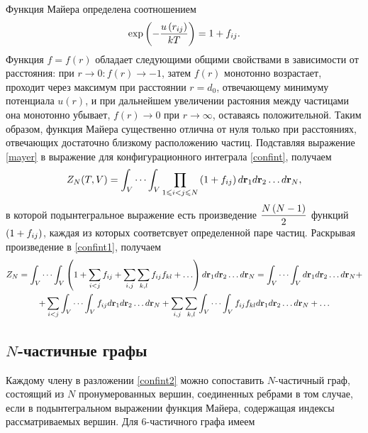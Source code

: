 Функция Майера определена соотношением
\vverh
\begin{gather}
	\exp \left( - \frac{u \left( r_{ij} \right)}{kT} \right) = 1 + f_{ij} . \label{mayer}
\end{gather}
Функция $f = f(r)$ обладает следующими общими свойствами в зависимости от расстояния: при $r \longrightarrow 0: f(r) \longrightarrow -1$, затем $f(r)$ монотонно возрастает, проходит через максимум при расстоянии $r = d_0$, отвечающему минимуму потенциала $u(r)$, и при дальнейшем увеличении растояния между частицами она монотонно убывает, $f(r) \longrightarrow 0$ при $r \longrightarrow \infty$, оставаясь положительной. Таким образом, функция Майера существенно отлична от нуля только при расстояниях, отвечающих достаточно близкому расположению частиц. Подставляя выражение \eqref{mayer} в выражение для конфигурационного интеграла \eqref{confint}, получаем
\vverh
\begin{gather}
	Z_N (T, V) = \int_V \cdots \int_V \prod_{1 \leqslant i < j \leqslant N} \left( 1 + f_{ij} \right) d \mathbf{r}_1 d \mathbf{r}_2 \dots d \mathbf{r}_N , \label{confint1}
\end{gather}
в которой подынтегральное выражение есть произведение $\displaystyle\frac{N \left( N - 1 \right)}{2}$ функций $\left( 1 + f_{ij} \right)$, каждая из которых соответсвует определенной паре частиц. Раскрывая произведение в \eqref{confint1}, получаем
\vverh
\begin{gather}
	Z_N = \int_V \cdots \int_V \lb 1 + \sum_{i < j} f_{ij} + \sum_{i, j} \sum_{k,l} f_{ij} f_{kl} + \dots \rb d \mathbf{r}_1 d \mathbf{r}_2 \dots d \mathbf{r}_N = \int_V \cdots \int_V d \mathbf{r}_1 d \mathbf{r}_2 \dots d \mathbf{r}_N + \notag \\ 
	+ \sum_{i < j} \int_V \cdots \int_V f_{ij} d \mathbf{r}_1 d \mathbf{r}_2 \dots d \mathbf{r}_N + \sum_{i, j} \sum_{k, l} \int_V \cdots \int_V f_{ij} f_{kl} d \mathbf{r}_1 d \mathbf{r}_2 \dots d \mathbf{r}_N + \dots \label{confint2}  
\end{gather}

\subsection{$N$-частичные графы}
Каждому члену в разложении \eqref{confint2} можно сопоставить $N$-частичный граф, состоящий из $N$ пронумерованных вершин, соединенных ребрами в том случае, если в подынтегральном выражении функция Майера, содержащая индексы рассматриваемых вершин. Для $6$-частичного графа имеем

